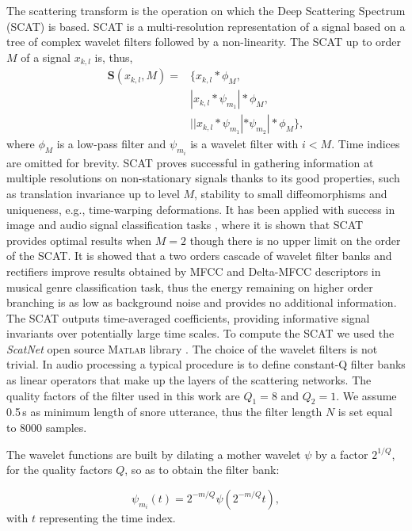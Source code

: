 The scattering transform \cite{Mallat2012} is the operation on which the Deep Scattering Spectrum (SCAT) is based. SCAT is a multi-resolution representation of a signal based on a tree of complex wavelet filters followed by a non-linearity. The SCAT up to order $M$ of a signal $x_{k,l}$ is, thus, 
\begin{equation}
\begin{split}
\mathbf{S}(x_{k,l}, M) = & \{ x_{k,l} * \phi_M, \\
&  |x_{k,l} * \psi_{m_1} | * \phi_M, \\
&  ||x_{k,l} *  \psi_{m_1} | * \psi_{m_2}| * \phi_M \},
\end{split}
\end{equation}
where $\phi_M$ is a low-pass filter and $\psi_{m_i}$ is a wavelet filter with $i < M$. Time indices are omitted for brevity.
SCAT proves successful in gathering information at multiple resolutions on non-stationary signals thanks to its good properties, such as translation invariance up to level $M$, stability to small diffeomorphisms and uniqueness, e.g., time-warping deformations. It has been applied with success in image \cite{Sifre2013rotation} and audio signal classification tasks \cite{Anden2011multiscale}, where it is shown that SCAT provides optimal results when $M=2$ though there is no upper limit on the order of the SCAT. It is showed that a two orders cascade of wavelet filter banks and rectifiers improve results obtained by MFCC and Delta-MFCC descriptors in musical genre classification task, thus the energy remaining on higher order branching is as low as background noise and provides no additional information. The SCAT outputs time-averaged coefficients, providing informative signal invariants over potentially large time scales.
To compute the SCAT we used the \textit{ScatNet} open source \textsc{Matlab} library \cite{sifre2013scatnet}.
The choice of the wavelet filters is not trivial. In audio processing a typical procedure is to define constant-Q filter banks as linear operators that make up the layers of the scattering networks. The quality factors of the filter used in this work are $Q_1=8$ and $Q_2=1$.
We assume 0.5\,s as minimum length of snore utterance, thus the filter length $N$ is set equal to 8000 samples.

The wavelet functions are built by dilating a mother wavelet $\psi$ by a factor $2^{1/Q}$, for the quality factors $Q$, so as to obtain the filter bank:

\begin{equation}
\psi_{m_i}(t)= 2^{-m/Q} \psi(2^{-m/Q}t),
\end{equation}
with $t$ representing the time index.


